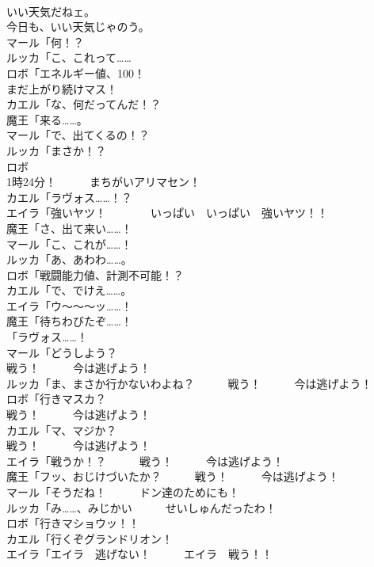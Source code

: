 \documentclass[8pt]{extreport}
\begin{document}
\begin{CJK}{UTF8}{min}
\\	いい天気だねェ。	
\\	今日も、いい天気じゃのう。	
\\	マール「何！？	
\\	ルッカ「こ、これって……	
\\	ロボ「エネルギー値、100！　　　
\\	まだ上がり続けマス！	
\\	カエル「な、何だってんだ！？	
\\	魔王「来る……。	
\\	マール「で、出てくるの！？	
\\	ルッカ「まさか！？	
\\	ロボ
\\	1時24分！　　　まちがいアリマセン！	
\\	カエル「ラヴォス……！？	
\\	エイラ「強いヤツ！　　　　いっぱい　いっぱい　強いヤツ！！	
\\	魔王「さ、出て来い……！	
\\	マール「こ、これが……！	
\\	ルッカ「あ、あわわ……。	
\\	ロボ「戦闘能力値、計測不可能！？	
\\	カエル「で、でけえ……。	
\\	エイラ「ウ～～～ッ……！	
\\	魔王「待ちわびたぞ……！	
\\	「ラヴォス……！	
\\	マール「どうしよう？　
\\	戦う！　　　今は逃げよう！	
\\	ルッカ「ま、まさか行かないわよね？　　　戦う！　　　今は逃げよう！	
\\	ロボ「行きマスカ？　
\\	戦う！　　　今は逃げよう！	
\\	カエル「マ、マジか？　
\\	戦う！　　　今は逃げよう！	
\\	エイラ「戦うか！？　　　戦う！　　　今は逃げよう！	
\\	魔王「フッ、おじけづいたか？　　　戦う！　　　今は逃げよう！	
\\	マール「そうだね！　　　ドン達のためにも！	
\\	ルッカ「み……、みじかい　　　せいしゅんだったわ！	
\\	ロボ「行きマショウッ！！	
\\	カエル「行くぞグランドリオン！	
\\	エイラ「エイラ　逃げない！　　　エイラ　戦う！！	

\end{CJK}
\end{document}
